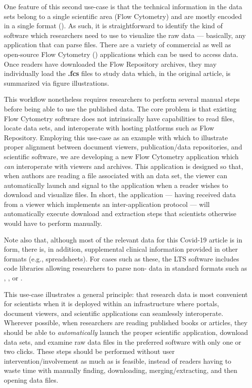 \documentclass[12pt,letterpaper]{article}
\newcommand{\FCS}{\resizebox{!}{8pt}{\AcronymText{FCS}}}
\newcommand{\FCM}{\resizebox{!}{8pt}{\AcronymText{FCM}}}
\newcommand{\ATexttclr}[1]{\textcolor{tcolor}{\textbf{#1}}}
\newcommand{\XML}{\resizebox{!}{8pt}{\AcronymText{XML}}}
\newcommand{\textscc}[1]{{\color{orr!35!black}{{%
{\textsc{\textbf{#1}}}}}}}
\newcommand{\AcronymText}[1]{{\textscc{#1}}}
\newcommand{\ARFF}{\resizebox{!}{8pt}{\AcronymText{ARFF}}}
\newcommand{\HDFFive}{\resizebox{!}{8pt}{\AcronymText{HDF5}}}
\newcommand{\SDRF}{\resizebox{!}{8pt}{\ATexttclr{S}}\resizebox{!}{8pt}{\ATexttclr{DR%
\hspace{1pt}{\raisebox{-1pt}{\fontfamily{qhv}\fontseries{b}\selectfont{}\Large{F}}%
}}}}
\newcommand{\PDF}{\resizebox{!}{8pt}{\AcronymText{PDF}}}
\newcommand{\p}[1]{

\vspace{.7em}#1}
\begin{document}
{\p{One feature of this second use-case is that the technical information 
in the data sets belong to a single scientific area (Flow Cytometry) 
and are mostly encoded in a single format (\FCS{}).  As such, it is 
straightforward to identify the kind of software which 
researchers need to use to visualize the raw data --- basically, any 
application that can parse \FCS{} files.  There are a variety 
of commercial as well as open-source Flow Cytometry (\FCM{}) applications 
which can be used to access \FCS{} data.  Once readers have 
downloaded the Flow Repository archives, they may individually 
load the \textbf{.fcs} files to study data which, in the 
original article, is summarized via figure illustrations.}

\p{This workflow nonetheless requires researchers to perform several 
manual steps before being able to use the published data.  The 
core problem is that existing Flow Cytometry software does not 
intrinsically have capabilities to read \PDF{} files, locate 
\FCS{} data sets, and interoperate with hosting platforms such 
as Flow Repository.  Employing this use-case as an example with 
which to illustrate proper alignment between document viewers, 
publication/data repositories, and scientific software, 
we are developing a new 
Flow Cytometry application which \textit{can} interoperate with 
\PDF{} viewers and \SDRF{} archives.  This application is 
designed so that, when authors are reading a \PDF{} file 
associated with an \FCS{} data set, the \PDF{} viewer 
can automatically launch and signal to the \FCM{} application 
when a reader wishes to download and visualize \FCS{} files.  
In short, the \FCM{} application --- having received 
data from a \PDF{} viewer which implements an 
\SDRF{} inter-application protocol --- will automatically 
execute download and extraction steps that scientists 
otherwise would have to perform manually.}

\p{Note also that, although most of the relevant 
data for this Covid-19 article is in \FCS{} form, 
there is, in addition, supplemental clinical information provided 
in other formats (e.g., spreadsheets).  For cases such as these, 
the LTS \FCM{} software includes code libraries allowing 
researchers to parse non-\FCS{} data in standard 
formats such as \XML{}, \HDFFive{}, or \ARFF{}.}  
   
\p{This use-case illustrates a general principle: that 
research data is most convenient for scientists when 
it is deployed within an infrastructure where 
portals, document viewers, and scientific applications 
can seamlessly interoperate.  Wherever possible, 
when researchers are reading published books or articles, 
they should be able to \textit{automatically} launch 
the proper scientific application, download data 
sets, and examine raw data files in the preferred 
software with only one or two clicks.  These steps should be 
performed without user intervention/involvement 
as much as is feasible, 
instead of readers having to waste time with manually 
finding, downloading, merging/extracting, 
and then opening data files.}

}
\end{document}
